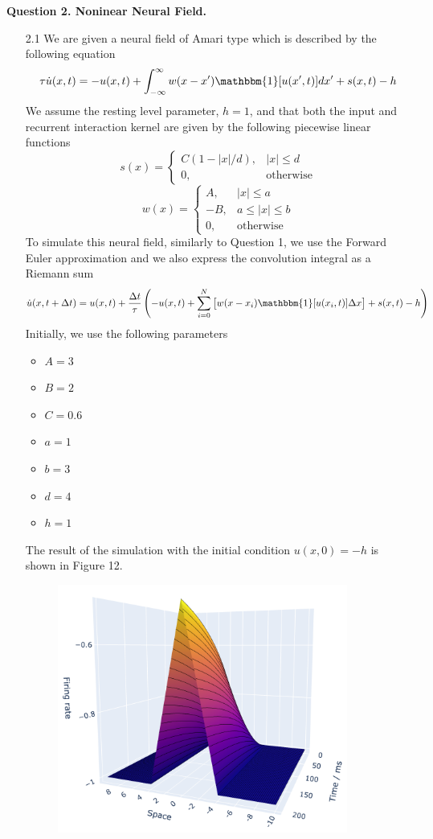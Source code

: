 \documentclass[12pt]{article}
\begin{document}
\newpage
\noindent\textbf{Question 2. Noninear Neural Field.}
\begin{enumerate}
\item[2.1] We are given a neural field of Amari type which is described by the following equation
\begin{equation}
    \tau \dot{u}(x, t) =   -u(x, t) + \int_{-\infty}^{\infty}w(x-x')\mathbbm{1}[u(x', t)]dx' + s(x, t) - h
\end{equation}
We assume the resting level parameter, $h=1$, and that both the input and recurrent interaction kernel are given by the 
following piecewise linear functions
\[
    s(x)=\begin{cases}
        C(1-|x|/d), & |x| \leq d\\
        0, & \text{otherwise}
    \end{cases}  
\]
\[
    w(x)=\begin{cases}
        A, & |x| \leq a\\
        -B, & a \leq |x| \leq b\\
        0, & \text{otherwise}
    \end{cases} 
\]
To simulate this neural field, similarly to Question 1, we use the Forward Euler approximation and we also 
express the convolution integral as a Riemann sum
\[
    \dot{u}(x, t+\Delta t) = u(x, t) + \frac{\Delta t}{\tau}\left(-u(x, t) + \sum_{i=0}^{N}\big[ w(x-x_{i})\mathbbm{1}[u(x_{i}, t)]\Delta x \big] + s(x, t) - h\right)
\]
Initially, we use the following parameters
\begin{itemize}
    \item $A=3$
    \item $B=2$
    \item $C=0.6$
    \item $a=1$
    \item $b=3$
    \item $d=4$
    \item $h=1$
\end{itemize}
The result of the simulation with the initial condition $u(x, 0)=-h$ is shown in Figure 12.
\begin{figure}[H]
    \centering
    \includegraphics[width=0.9\textwidth]{./figure12.png}

\end{figure}
\end{enumerate}
\end{document}
